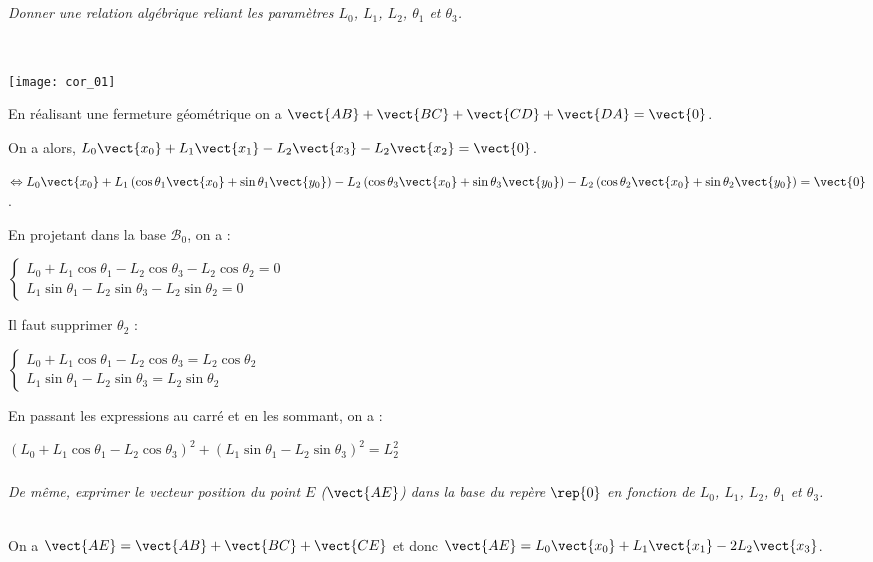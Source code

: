 \begin{multicols}{2}
\subparagraph{}\textit{Donner
une relation algébrique reliant les paramètres $L_0$, $L_1$, $L_2$, $\theta_1$ et $\theta_3$.}
\ifprof
\begin{corrige}~\\
\begin{center}
\texttt{[image: cor\_01]}
\end{center}

En réalisant une fermeture géométrique on a $\vect{AB}+\vect{BC}+\vect{CD}+\vect{DA}=\vect{0}$.

On a alors, $L_0\vect{x_0}+L_1\vect{x_1}-L_2\vect{x_3}-L_2\vect{x_2}=\vect{0}$.

$\Leftrightarrow L_0\vect{x_0}+L_1\left( \cos \theta_1 \vect{x_0}+ \sin \theta_1 \vect{y_0} \right)-L_2\left( \cos \theta_3\vect{x_0} + \sin \theta_3\vect{y_0}  \right)-L_2\left( \cos \theta_2\vect{x_0} + \sin \theta_2\vect{y_0}  \right)=\vect{0}$.

En projetant dans la base $\mathcal{B}_0$, on a :

$
\left\{
\begin{array}{l}
L_0 + L_1 \cos \theta_1 -L_2\cos \theta_3-L_2 \cos \theta_2=0 \\
L_1\sin \theta_1-L_2 \sin \theta_3-L_2 \sin \theta_2=0 
\end{array} \right.
$

Il faut supprimer $\theta_2$ :

$
\left\{
\begin{array}{l}
L_0 + L_1 \cos \theta_1 -L_2\cos \theta_3=L_2 \cos \theta_2 \\
L_1\sin \theta_1-L_2 \sin \theta_3=L_2 \sin \theta_2
\end{array} \right.
$

En passant les expressions au carré et en les sommant, on a :

$\left(L_0 + L_1 \cos \theta_1 -L_2\cos \theta_3\right)^2 + \left( L_1\sin \theta_1-L_2 \sin \theta_3\right)^2=L_2^2 $


\end{corrige}
\else
\fi

\subparagraph{}\textit{De même, exprimer le vecteur position du point $E$ ($\vect{AE}$) dans la base du repère $\rep{0}$ en fonction de $L_0$, $L_1$, $L_2$, $\theta_1$ et $\theta_3$.}
\ifprof
\begin{corrige}~\\
On a $\vect{AE}=\vect{AB}+\vect{BC}+\vect{CE}$ et donc 
 $\vect{AE}=L_0\vect{x_0}+L_1 \vect{x_1} -2L_2\vect{x_3}$. 
 

\end{corrige}
\end{multicols}
